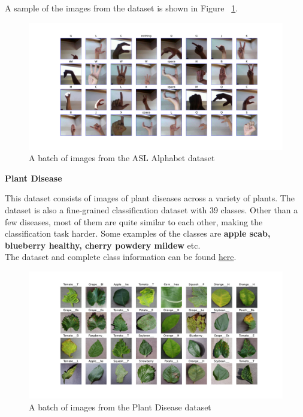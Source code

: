 \documentclass[a4paper,11pt,openright]{book}
\begin{document}
A sample of the images from the dataset is shown in Figure ~\ref{fig:asl}.
\begin{figure}[!htb]
    \centering
    \includegraphics[width=1\textwidth]{images/asl.pdf}
    \caption{A batch of images from the ASL Alphabet dataset}
    \label{fig:asl}

\end{figure}

\textbf{Plant Disease}

This dataset consists of images of plant diseases across a variety of plants. The dataset is also a fine-grained classification dataset with 39 classes. Other than a few diseases, most of them are quite similar to each other, making the classification task harder. Some examples of the classes are \textbf{apple scab, blueberry healthy, cherry powdery mildew} etc.\\
The dataset and complete class information can be found \href{https://www.kaggle.com/datasets/rajibdpi/plant-disease-dataset}{here}.
\begin{figure}[!htb]
    \centering
    \includegraphics[width=1\textwidth]{images/plantdisease.pdf}
    \caption{A batch of images from the Plant Disease dataset}
    \label{fig:plant}

\end{figure}
\end{document}
